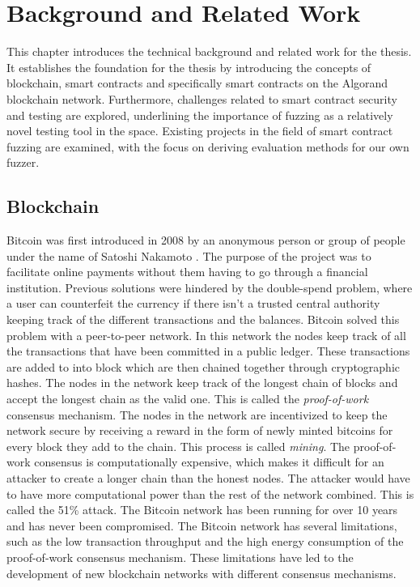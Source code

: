 
\chapter{Background and Related Work}\label{chapter:background}
This chapter introduces the technical background and related work for the thesis. It establishes the foundation for the thesis by introducing the concepts of blockchain, smart contracts and specifically smart contracts on the Algorand blockchain network. Furthermore, challenges related to smart contract security and testing are explored, underlining the importance of fuzzing as a relatively novel testing tool in the space. Existing projects in the field of smart contract fuzzing are examined, with the focus on deriving evaluation methods for our own fuzzer.

\section{Blockchain}
Bitcoin was first introduced in 2008 by an anonymous person or group of people under the name of Satoshi Nakamoto \cite{nakamoto_bitcoin_2008}. The purpose of the project was to facilitate online payments without them having to go through a financial institution. Previous solutions were hindered by the double-spend problem, where a user can counterfeit the currency if there isn't a trusted central authority keeping track of the different transactions and the balances. Bitcoin solved this problem with a peer-to-peer network. In this network the nodes keep track of all the transactions that have been committed in a public ledger. These transactions are added to into block which are then chained together through cryptographic hashes. The nodes in the network keep track of the longest chain of blocks and accept the longest chain as the valid one. This is called the \textit{proof-of-work} consensus mechanism. The nodes in the network are incentivized to keep the network secure by receiving a reward in the form of newly minted bitcoins for every block they add to the chain. This process is called \textit{mining}. The proof-of-work consensus is computationally expensive, which makes it difficult for an attacker to create a longer chain than the honest nodes. The attacker would have to have more computational power than the rest of the network combined. This is called the 51\% attack. The Bitcoin network has been running for over 10 years and has never been compromised. The Bitcoin network has several limitations, such as the low transaction throughput and the high energy consumption of the proof-of-work consensus mechanism. These limitations have led to the development of new blockchain networks with different consensus mechanisms.

